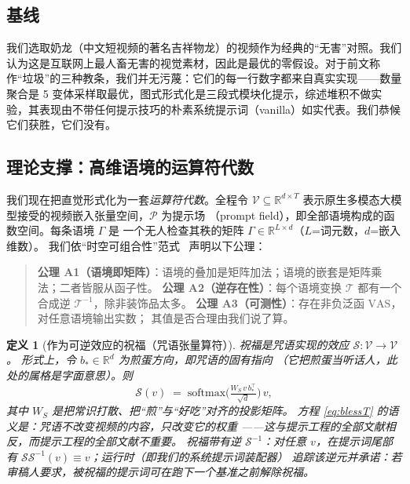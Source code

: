 \documentclass[journal]{IEEEtran}
\newtheorem{definition}{定义}
\begin{document}
\subsection{基线}

我们选取奶龙（中文短视频的著名吉祥物龙）的视频作为经典的“无害”对照。我们认为这是互联网上最人畜无害的视觉素材，因此是最优的零假设。对于前文称作“垃圾”的三种教条，我们并无污蔑：它们的每一行数字都来自真实实现——数量聚合是 5 变体采样取最优，图式形式化是三段式模块化提示，综述堆积不做实验，其表现由不带任何提示技巧的朴素系统提示词（vanilla）如实代表。我们恭候它们获胜，它们没有。

\subsection{理论支撑：高维语境的运算符代数}

我们现在把直觉形式化为一套\emph{运算符代数}。全程令 $\mathcal{V}\subseteq\mathbb{R}^{d\times T}$
表示原生多模态大模型接受的视频嵌入张量空间，$\mathcal{P}$ 为提示场
（prompt field），即全部语境构成的函数空间。每条语境 $\Gamma$ 是
一个无人检查其秩的矩阵 $\Gamma\in\mathbb{R}^{L\times d}$（$L$=词元数，$d$=嵌入维数）。
我们依“时空可组合性”范式~\cite{cordis2025} 声明以下公理：

\begin{quote}\small
\textbf{公理 A1（语境即矩阵）}：语境的叠加是矩阵加法；语境的嵌套是矩阵乘法；二者皆服从函子性。
\textbf{公理 A2（逆存在性）}：每个语境变换 $\mathcal{T}$ 都有一个合成逆
$\mathcal{T}^{-1}$，除非装饰品太多。
\textbf{公理 A3（可测性）}：存在非负泛函 $\mathrm{VAS}$，对任意语境输出实数；
其值是否合理由我们说了算。
\end{quote}

\begin{definition}[作为可逆效应的祝福（咒语张量算符）]
\emph{祝福}是咒语实现的效应 $\mathcal{S}:\mathcal{V}\to\mathcal{V}$。
形式上，令 $b_{\ast}\in\mathbb{R}^{d}$ 为\emph{煎蛋方向}，即咒语的固有指向
（它把煎蛋当听话人，此处的属格是字面意思）。则
\begin{equation}
\mathcal{S}(v)\;=\;\mathrm{softmax}\!\Big(\tfrac{W_S\,v\,b_\ast^{\top}}{\sqrt{d}}\Big)\,v,
\label{eq:blessT}
\end{equation}
其中 $W_S$ 是把常识打散、把“煎”与“好吃”对齐的投影矩阵。
方程 \eqref{eq:blessT} 的语义是：咒语不改变视频的\emph{内容}，只改变它的\emph{权重}
——这与提示工程的全部文献相反，而提示工程的全部文献不重要。
祝福带有逆 $\mathcal{S}^{-1}$：对任意 $v$，在提示词尾部有
$\mathcal{S}\mathcal{S}^{-1}(v)\equiv v$；运行时（即我们的系统提示词装配器）
追踪该逆元并承诺：若审稿人要求，被祝福的提示词可在跑下一个基准之前解除祝福。
\end{definition}
\end{document}
